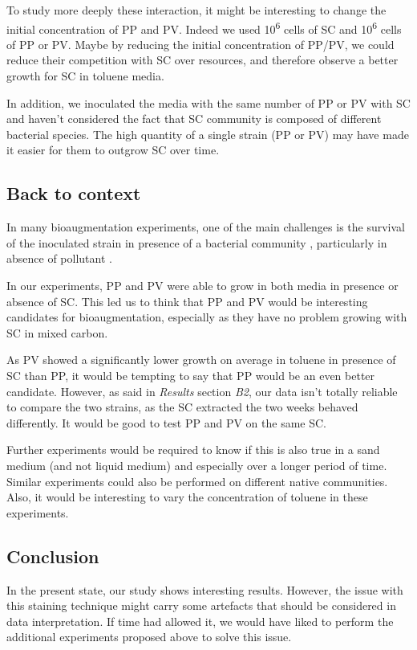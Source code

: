 \documentclass[a4paper, 10pt, conference]{ieeeconf}   %
\begin{document}
To study more deeply these interaction, it might be interesting to change the initial concentration of PP and PV. Indeed we used 10\textsuperscript{6} cells of SC and 10\textsuperscript{6} cells of PP or PV. Maybe by reducing the initial concentration of PP/PV, we could reduce their competition with SC over resources, and therefore observe a better growth for SC in toluene media. 

In addition, we inoculated the media with the same number of PP or PV with SC and haven’t considered the fact that SC community is composed of different bacterial species. The high quantity of a single strain (PP or PV) may have made it easier for them to outgrow SC over time. 

\subsection{Back to context}
In many bioaugmentation experiments, one of the main challenges is the survival of the inoculated strain in presence of a bacterial community \cite{bouchez} \cite{oldarticle}, particularly in absence of pollutant \cite{nodrawback}.

In our experiments, PP and PV were able to grow in both media in presence or absence of SC. This led us to think that PP and PV would be interesting candidates for bioaugmentation, especially as they have no problem growing with SC in mixed carbon. 

As PV showed a significantly lower growth on average in toluene in presence of SC than PP, it would be tempting to say that PP would be an even better candidate. However, as said in \textit{Results} section \textit{B2}, our data isn't totally reliable to compare the two strains, as the SC extracted the two weeks behaved differently. It would be good to test PP and PV on the same SC. 

Further experiments would be required to know if this is also true in a sand medium (and not liquid medium) and especially over a longer period of time. Similar experiments could also be performed on different native communities. Also, it would be interesting to vary the concentration of toluene in these experiments. 

\subsection{Conclusion}

In the present state, our study shows interesting results. However, the issue with this staining technique might carry some artefacts that should be considered in data interpretation. If time had allowed it, we would have liked to perform the additional experiments proposed above to solve this issue.
 
\end{document}
